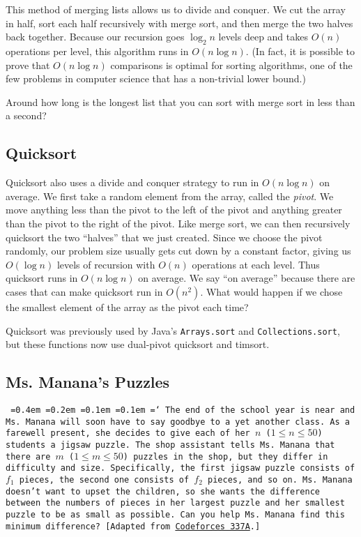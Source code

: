 This method of merging lists allows us to divide and conquer. We cut the array in half, sort each half recursively with merge sort, and then merge the two halves back together. Because our recursion goes $\log_2 n$ levels deep and takes $O(n)$ operations per level, this algorithm runs in $O(n \log n)$. (In fact, it is possible to prove that $O(n \log n)$ comparisons is optimal for sorting algorithms, one of the few problems in computer science that has a non-trivial lower bound.)

Around how long is the longest list that you can sort with merge sort in less than a second?

\subsection{Quicksort}

Quicksort also uses a divide and conquer strategy to run in $O(n \log n)$ on average. We first take a random element from the array, called the \emph{pivot}. We move anything less than the pivot to the left of the pivot and anything greater than the pivot to the right of the pivot. Like merge sort, we can then recursively quicksort the two ``halves'' that we just created. Since we choose the pivot randomly, our problem size usually gets cut down by a constant factor, giving us $O(\log n)$ levels of recursion with $O(n)$ operations at each level. Thus quicksort runs in $O(n \log n)$ on average. We say ``on average'' because there are cases that can make quicksort run in $O(n^2)$. What would happen if we chose the smallest element of the array as the pivot each time?

Quicksort was previously used by Java's \texttt{Arrays.sort} and \texttt{Collections.sort}, but these functions now use dual-pivot quicksort and timsort.

\subsection{Ms. Manana's Puzzles}

\texttt{
  \font=0.4em%
  \font=0.2em%
  \font=0.1em%
  \font=0.1em%
  \hyphenchar\font=`\-%
  The end of the school year is near and Ms. Manana will soon have to say goodbye to a yet another class. As a farewell present, she decides to give each of her $n$ ($1\le n\le 50$) students a jigsaw puzzle. The shop assistant tells Ms. Manana that there are $m$ ($1\le m\le 50$) puzzles in the shop, but they differ in difficulty and size. Specifically, the first jigsaw puzzle consists of $f_1$ pieces, the second one consists of $f_2$ pieces, and so on. Ms. Manana doesn't want to upset the children, so she wants the difference between the numbers of pieces in her largest puzzle and her smallest puzzle to be as small as possible. Can you help Ms. Manana find this minimum difference? [Adapted from \href{http://codeforces.com/problemset/problem/337/A}{Codeforces 337A}.]
}

